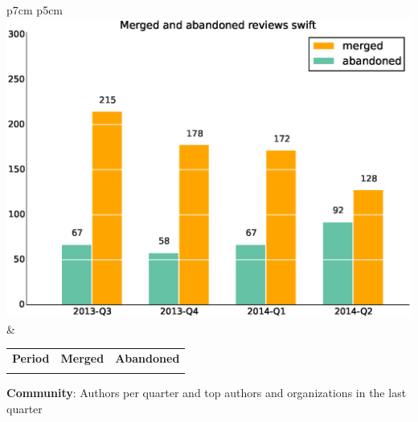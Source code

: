 \documentclass[a4wide,11pt]{report}
\begin{document}
\begin{tabular}{p{7cm} p{5cm}}
    \vspace{0pt} 
    \includegraphics[scale=.35]{figs/submitted_reviewsswift.eps}
    & 
    \vspace{0pt}
    \begin{tabular}{l|r|r|}%
    \bfseries Period & \bfseries Merged & \bfseries Abandoned %
    \csvreader[head to column names]{data/submitted_reviewsswift.csv}{}%
    {\\ & \merged & \abandoned}
    \end{tabular}
\end{tabular}


\textbf{Community}: Authors per quarter and top authors and organizations in the last quarter
\end{document}
